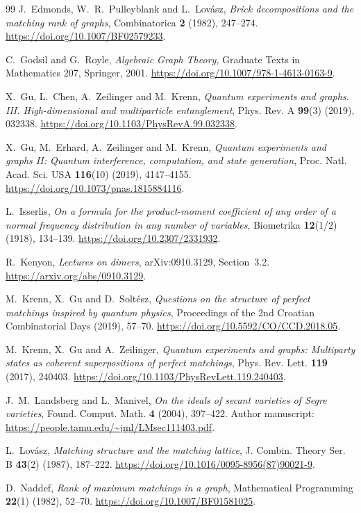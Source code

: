 \documentclass[11pt]{article}
\theoremstyle{remark}\newtheorem{remark}[theorem]{Remark}
\begin{document}
\begin{thebibliography}{99}
J.~Edmonds, W.~R.~Pulleyblank and L.~Lov\'asz,
\emph{Brick decompositions and the matching rank of graphs},
Combinatorica \textbf{2} (1982), 247--274.
\url{https://doi.org/10.1007/BF02579233}.

C.~Godsil and G.~Royle,
\emph{Algebraic Graph Theory}, Graduate Texts in Mathematics 207,
Springer, 2001.
\url{https://doi.org/10.1007/978-1-4613-0163-9}.

X.~Gu, L.~Chen, A.~Zeilinger and M.~Krenn,
\emph{Quantum experiments and graphs. III. High-dimensional and multiparticle entanglement},
Phys. Rev. A \textbf{99}(3) (2019), 032338.
\url{https://doi.org/10.1103/PhysRevA.99.032338}.

X.~Gu, M.~Erhard, A.~Zeilinger and M.~Krenn,
\emph{Quantum experiments and graphs II: Quantum interference, computation, and state generation},
Proc. Natl. Acad. Sci. USA \textbf{116}(10) (2019), 4147--4155.
\url{https://doi.org/10.1073/pnas.1815884116}.

L.~Isserlis,
\emph{On a formula for the product-moment coefficient of any order of a normal frequency distribution in any number of variables},
Biometrika \textbf{12}(1/2) (1918), 134--139.
\url{https://doi.org/10.2307/2331932}.

R.~Kenyon,
\emph{Lectures on dimers},
arXiv:0910.3129, Section~3.2.
\url{https://arxiv.org/abs/0910.3129}.

M.~Krenn, X.~Gu and D.~Solt\'esz,
\emph{Questions on the structure of perfect matchings inspired by quantum physics},
Proceedings of the 2nd Croatian Combinatorial Days (2019), 57--70.
\url{https://doi.org/10.5592/CO/CCD.2018.05}.

M.~Krenn, X.~Gu and A.~Zeilinger,
\emph{Quantum experiments and graphs: Multiparty states as coherent superpositions of perfect matchings},
Phys. Rev. Lett. \textbf{119} (2017), 240403.
\url{https://doi.org/10.1103/PhysRevLett.119.240403}.

J.~M.~Landsberg and L.~Manivel,
\emph{On the ideals of secant varieties of Segre varieties},
Found. Comput. Math. \textbf{4} (2004), 397--422.
Author manuscript:
\url{https://people.tamu.edu/~jml/LMsec111403.pdf}.

L.~Lov\'asz,
\emph{Matching structure and the matching lattice},
J. Combin. Theory Ser. B \textbf{43}(2) (1987), 187--222.
\url{https://doi.org/10.1016/0095-8956(87)90021-9}.

D.~Naddef,
\emph{Rank of maximum matchings in a graph},
Mathematical Programming \textbf{22}(1) (1982), 52--70.
\url{https://doi.org/10.1007/BF01581025}.


\end{thebibliography}
\end{document}
